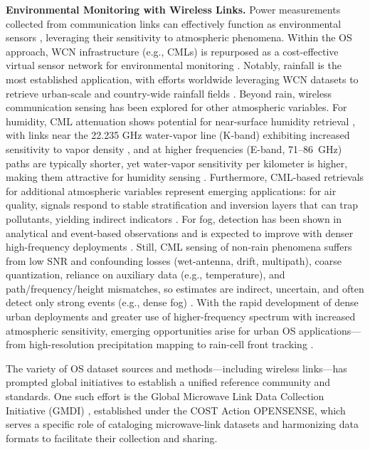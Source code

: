 \documentclass[manuscript]{copernicus}
\begin{document}
\noindent \textbf{Environmental Monitoring with Wireless Links.} \label{sec:sensing_overview}
Power measurements collected from communication links can effectively function as environmental sensors \citep{messer2006environmental}, leveraging their sensitivity to atmospheric phenomena.
Within the OS approach, WCN infrastructure (e.g., CMLs) is repurposed as a cost-effective virtual sensor network for environmental monitoring \citep{upton2005microwave,overeem2011measuring}.
Notably, rainfall is the most established application, with efforts worldwide leveraging WCN datasets to retrieve urban-scale and country-wide rainfall fields \citep{graf2020rainfall,messer2016cellular,overeem2023commercial,chwala2019commercial,zhang2023precipitation,vspavckova2021year}.
Beyond rain, wireless communication sensing has been explored for other atmospheric variables. 
For humidity, CML attenuation shows potential for near-surface humidity retrieval \citep{rubin2022challenges}, with links near the 22.235 GHz water-vapor line (K-band) exhibiting increased sensitivity to vapor density \citep{rubin2023high}, and at higher frequencies (E-band, 71--86~GHz) paths are typically shorter, yet water-vapor sensitivity per kilometer is higher, making them attractive for humidity sensing \citep{fencl2021retrieving}. 
Furthermore, CML-based retrievals for additional atmospheric variables represent emerging applications: for air quality, signals respond to stable stratification and inversion layers that can trap pollutants, yielding indirect indicators \citep{david2016using}. For fog, detection has been shown in analytical and event-based observations and is expected to improve with denser high-frequency deployments \citep{david2015cellular,csurgai2010fog}.
Still, CML sensing of non-rain phenomena suffers from low SNR and confounding losses (wet-antenna, drift, multipath), coarse quantization, reliance on auxiliary data (e.g., temperature), and path/frequency/height mismatches, so estimates are indirect, uncertain, and often detect only strong events (e.g., dense fog) \citep{rubin2022challenges,david2015cellular}.
With the rapid development of dense urban deployments and greater use of higher-frequency spectrum with increased atmospheric sensitivity, emerging opportunities arise for urban OS applications—from high-resolution precipitation mapping to rain-cell front tracking \citep{ostrometzky2024opportunistic,janco2023city,zhang2023environment,hadar2020parameter}.

The variety of OS dataset sources and methods—including wireless links—has prompted global initiatives to establish a unified reference community and standards. One such effort is the Global Microwave Link Data Collection Initiative (GMDI) \citep{fencl2025new}, established under the COST Action OPENSENSE, which serves a specific role of cataloging microwave-link datasets and harmonizing data formats to facilitate their collection and sharing.
\end{document}
